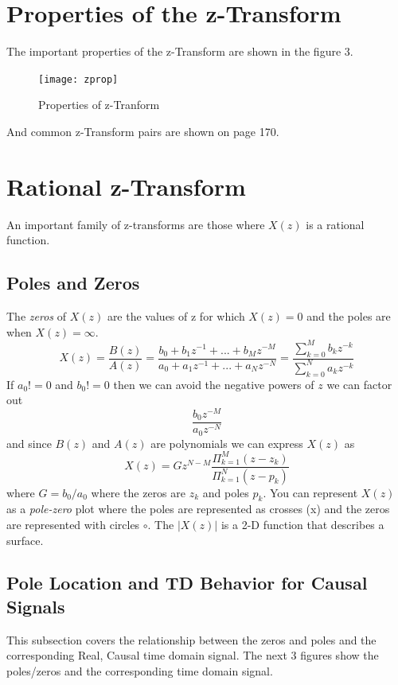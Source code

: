 \documentclass{article} %
\begin{document}
	\section{Properties of the z-Transform}
	The important properties of the z-Transform are shown in the figure 3.
	
	\begin{figure}[h]
	\centering
	\texttt{[image: zprop]}
	\caption{Properties of z-Tranform}
	\end{figure}
	
	And common z-Transform pairs are shown on page 170.
	
	\section{Rational z-Transform}
	An important family of z-transforms are those where $X(z)$ is a rational function.
	\subsection{Poles and Zeros}
	The \textit{zeros} of $X(z)$ are the values of z for which $X(z) = 0$ and the poles are when $X(z) = \infty$. 
	\begin{equation}
	X(z) = \frac{B(z)}{A(z)} = \frac{b_0 + b_1z^{-1}+ ... + b_Mz^{-M}}{a_0 + a_1z^{-1}+ ... + a_Nz^{-N}} = \frac{\sum_{k=0}^M b_kz^{-k}}{\sum_{k=0}^N a_kz^{-k}}
	\end{equation}
	If $a_0 != 0$ and $b_0 != 0$ then we can avoid the negative powers of $z$ we can factor out
	\begin{equation}
	\frac{b_0z^{-M}}{a_0z^{-N}}
	\end{equation}
	and since $B(z)$ and $A(z)$ are polynomials we can express $X(z)$ as
	\begin{equation}
	X(z) = Gz^{N-M} \frac{\Pi_{k=1}^M (z-z_k)}{\Pi_{k=1}^N(z-p_k)}
	\end{equation}
	where $G = b_0/a_0$ where the zeros are $z_k$ and poles $p_k$. You can represent $X(z)$ as a \textit{pole-zero} plot where the poles are represented as crosses (x) and the zeros are represented with circles $\circ$. The $|X(z)|$ is a 2-D function that describes a surface. 
	\subsection{Pole Location and TD Behavior for Causal Signals}
	This subsection covers the relationship between the zeros and poles and the corresponding Real, Causal time domain signal. The next 3 figures show the poles/zeros and the corresponding time domain signal. 
	
\end{document}
